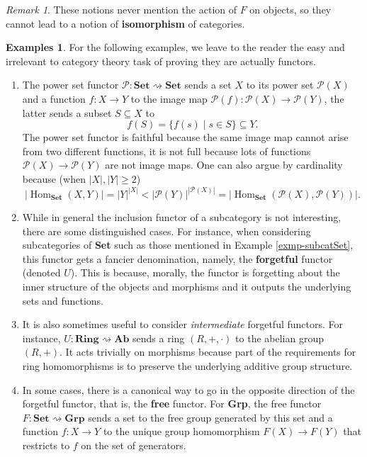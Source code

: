 \documentclass{article}
\theoremstyle{definition}
\newtheorem{exmps}[thm]{Examples}
\theoremstyle{remark}
\newtheorem{rem}[thm]{Remark}
\newcommand{\mP}{\mathcal{P}}
\DeclareMathOperator{\Hom}{Hom}
\begin{document}
\begin{rem} 
These notions never mention the action of $F$ on objects, so they cannot lead to a notion of \textbf{isomorphism} of categories.
\end{rem}

\begin{exmps}
	For the following examples, we leave to the reader the easy and irrelevant to category theory task of proving they are actually functors.
	\begin{enumerate}
		\item The power set functor $\mP: \textbf{Set} \rightsquigarrow \textbf{Set}$ sends a set $X$ to its power set $\mP(X)$ and a function $f: X\rightarrow Y$ to the image map $\mP(f):\mP(X)\rightarrow \mP(Y)$, the latter sends a subset $S\subseteq X$ to \[f(S) = \{f(s) \mid s \in S\} \subseteq Y.\]
		The power set functor is faithful because the same image map cannot arise from two different functions, it is not full because lots of functions $\mP(X) \rightarrow \mP(Y)$ are not image maps. One can also argue by cardinality because (when $|X|, |Y| \geq 2$)
		\[|\Hom_{\textbf{Set}}(X,Y)| = |Y|^{|X|} < |\mP(Y)|^{|\mP(X)|} = |\Hom_{\textbf{Set}}(\mP(X), \mP(Y))|.\]
		\item While in general the inclusion functor of a subcategory is not interesting, there are some distinguished cases. For instance, when considering subcategories of \textbf{Set} such as those mentioned in Example \ref{exmp-subcatSet}, this functor gets a fancier denomination, namely, the \textbf{forgetful} functor (denoted $U$). This is because, morally, the functor is forgetting about the inner structure of the objects and morphisms and it outputs the underlying sets and functions.
		
		\item It is also sometimes useful to consider \textit{intermediate} forgetful functors. For instance, $U: \textbf{Ring} \rightsquigarrow \textbf{Ab}$ sends a ring $(R, +, \cdot)$ to the abelian group $(R, +)$. It acts trivially on morphisms because part of the requirements for ring homomorphisms is to preserve the underlying additive group structure.
		
		\item In some cases, there is a canonical way to go in the opposite direction of the forgetful functor, that is, the \textbf{free} functor. For \textbf{Grp}, the free functor $F: \textbf{Set} \rightsquigarrow \textbf{Grp}$ sends a set to the free group generated by this set and a function $f: X\rightarrow Y$ to the unique group homomorphism $F(X) \rightarrow F(Y)$ that restricts to $f$ on the set of generators.
		

\end{enumerate}
\end{exmps}
\end{document}
